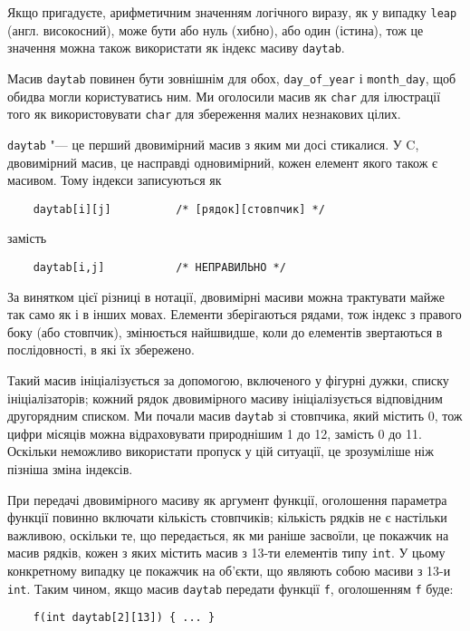 \documentclass[a4paper,12pt]{book}
\begin{document}
  Якщо пригадуєте, арифметичним значенням логічного виразу, як у випадку \texttt{leap}
  (англ. високосний), може бути або нуль (хибно), або один (істина), тож це значення можна
  також використати як індекс масиву \texttt{daytab}.

  Масив \texttt{daytab} повинен бути зовнішнім для обох, \texttt{day\_of\_year} і
  \texttt{month\_day}, щоб обидва могли користуватись ним. Ми оголосили масив як
  \texttt{char} для ілюстрації того як використовувати \texttt{char} для збереження малих
  незнакових цілих.

  \texttt{daytab} "--- це перший двовимірний масив з яким ми досі стикалися. У C,
  двовимірний масив, це насправді одновимірний, кожен елемент якого також є
  масивом. Тому індекси записуються як
  \begin{verbatim}
    daytab[i][j]          /* [рядок][стовпчик] */
  \end{verbatim}
  замість
  \begin{verbatim}
    daytab[i,j]           /* НЕПРАВИЛЬНО */
  \end{verbatim}

  За винятком цієї різниці в нотації, двовимірні масиви можна трактувати майже так
  само як і в інших мовах. Елементи зберігаються рядами, тож індекс з правого боку (або
  стовпчик), змінюється найшвидше, коли до елементів звертаються в послідовності, в які
  їх збережено.

  Такий масив ініціалізується за допомогою, включеного у фігурні дужки, списку
  ініціалізаторів; кожний рядок двовимірного масиву ініціалізується відповідним
  другорядним списком. Ми почали масив \texttt{daytab} зі стовпчика, який містить 0, тож
  цифри місяців можна відраховувати природнішим 1 до 12, замість 0 до 11. Оскільки
  неможливо використати пропуск у цій ситуації, це зрозуміліше ніж пізніша зміна індексів.

  При передачі двовимірного масиву як аргумент функції, оголошення параметра функції
  повинно включати кількість стовпчиків; кількість рядків не є настільки важливою, оскільки те, що
  передається, як ми раніше засвоїли, це покажчик на масив рядків, кожен з яких містить
  масив з 13-ти елементів типу \texttt{int}. У цьому конкретному випадку це покажчик на
  об'єкти, що являють собою масиви з 13-и \texttt{int}. Таким чином, якщо масив
  \texttt{daytab} передати функції \texttt{f}, оголошенням \texttt{f} буде:
  \begin{verbatim}
    f(int daytab[2][13]) { ... }
  \end{verbatim}
\end{document}
